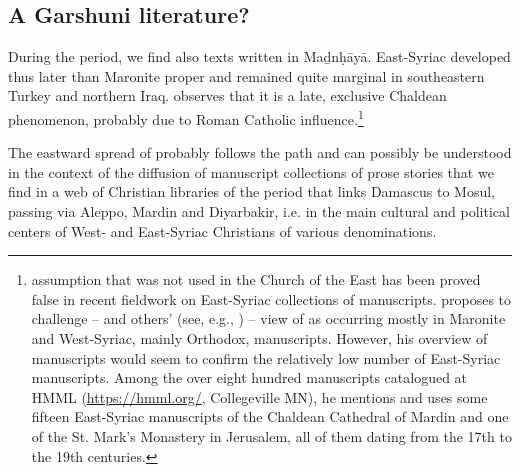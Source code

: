 \documentclass[output=paper,colorlinks,citecolor=brown,arabfont,syriacfont]{langscibook}
\begin{document}
    \subsection{A Garshuni literature?}\label{ch.3.6.ss.2.2}

During the  period, we find also  texts written in Maḏnḥāyā. East-Syriac  developed thus later than Maronite  proper and remained quite marginal in southeastern Turkey and northern Iraq. \citet[468--469]{briquel_chatonnet2005} observes that it is a late, exclusive Chaldean phenomenon, probably due to Roman Catholic influence.\footnote{%
 assumption that  was not used in the Church of the East has been proved false in recent fieldwork on East-Syriac collections of manuscripts. \citet{mccollum2014} proposes to challenge  -- and others' (see, e.g., \citealt{salibi1959,samir1982,coakley2001,briquel_chatonnet2005}) -- view of  as occurring mostly in Maronite and West-Syriac, mainly  Orthodox, manuscripts. However, his overview of  manuscripts would seem to confirm the relatively low number of East-Syriac  manuscripts. Among the over eight hundred  manuscripts catalogued at HMML (\url{https://hmml.org/}, Collegeville MN), he mentions and uses some fifteen East-Syriac manuscripts of the Chaldean Cathedral of Mardin and one of the St. Mark's Monastery in Jerusalem, all of them dating from the 17th to the 19th centuries.}

The eastward spread of  probably follows the path and can possibly be understood in the context of the diffusion of manuscript collections of  prose stories that we find in a web of Christian libraries of the  period that links Damascus to Mosul, passing via Aleppo, Mardin and Diyarbakir, i.e. in the main cultural and political centers of West- and East-Syriac Christians of various denominations.
\end{document}
